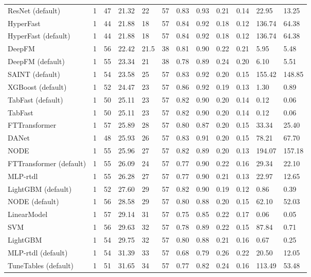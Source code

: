 \begin{tabular}{lllllrllllll}
ResNet (default) & 1 & 47 & 21.32 & 22 & 57 & 0.83 & 0.93 & 0.21 & 0.14 & 22.95 & 13.25 \\
HyperFast & 1 & 44 & 21.88 & 18 & 57 & 0.84 & 0.92 & 0.18 & 0.12 & 136.74 & 64.38 \\
HyperFast (default) & 1 & 44 & 21.88 & 18 & 57 & 0.84 & 0.92 & 0.18 & 0.12 & 136.74 & 64.38 \\
DeepFM & 1 & 56 & 22.42 & 21.5 & 38 & 0.81 & 0.90 & 0.22 & 0.21 & 5.95 & 5.48 \\
DeepFM (default) & 1 & 55 & 23.34 & 21 & 38 & 0.78 & 0.89 & 0.24 & 0.20 & 6.10 & 5.51 \\
SAINT (default) & 1 & 54 & 23.58 & 25 & 57 & 0.83 & 0.92 & 0.20 & 0.15 & 155.42 & 148.85 \\
XGBoost (default) & 1 & 52 & 24.47 & 23 & 57 & 0.86 & 0.92 & 0.19 & 0.13 & 1.30 & 0.89 \\
TabFast (default) & 1 & 50 & 25.11 & 23 & 57 & 0.82 & 0.90 & 0.20 & 0.14 & 0.12 & 0.06 \\
TabFast & 1 & 50 & 25.11 & 23 & 57 & 0.82 & 0.90 & 0.20 & 0.14 & 0.12 & 0.06 \\
FTTransformer & 1 & 57 & 25.89 & 28 & 57 & 0.80 & 0.87 & 0.20 & 0.15 & 33.34 & 25.40 \\
DANet & 1 & 48 & 25.93 & 26 & 57 & 0.83 & 0.91 & 0.20 & 0.15 & 78.21 & 67.70 \\
NODE & 1 & 55 & 25.96 & 27 & 57 & 0.82 & 0.89 & 0.20 & 0.13 & 194.07 & 157.18 \\
FTTransformer (default) & 1 & 55 & 26.09 & 24 & 57 & 0.77 & 0.90 & 0.22 & 0.16 & 29.34 & 22.10 \\
MLP-rtdl & 1 & 55 & 26.28 & 27 & 57 & 0.77 & 0.90 & 0.21 & 0.13 & 22.97 & 12.65 \\
LightGBM (default) & 1 & 52 & 27.60 & 29 & 57 & 0.82 & 0.90 & 0.19 & 0.12 & 0.86 & 0.39 \\
NODE (default) & 1 & 56 & 28.58 & 29 & 57 & 0.80 & 0.88 & 0.20 & 0.15 & 62.10 & 52.03 \\
LinearModel & 1 & 57 & 29.14 & 31 & 57 & 0.75 & 0.85 & 0.22 & 0.17 & 0.06 & 0.05 \\
SVM & 1 & 56 & 29.63 & 32 & 57 & 0.78 & 0.89 & 0.22 & 0.15 & 87.84 & 0.71 \\
LightGBM & 1 & 54 & 29.75 & 32 & 57 & 0.80 & 0.88 & 0.21 & 0.16 & 0.67 & 0.25 \\
MLP-rtdl (default) & 1 & 54 & 31.39 & 33 & 57 & 0.68 & 0.79 & 0.26 & 0.22 & 20.50 & 12.05 \\
TuneTables (default) & 1 & 51 & 31.65 & 34 & 57 & 0.77 & 0.82 & 0.24 & 0.16 & 113.49 & 53.48 \\

\end{tabular}
